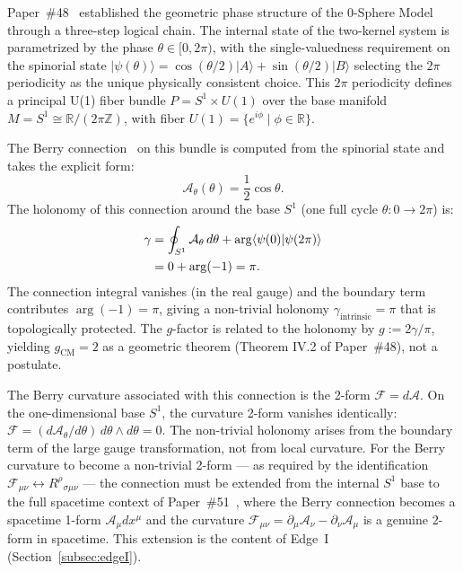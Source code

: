 \documentclass[%
 reprint, amsmath,amssymb, aps, prd, ]{revtex4-2}
\numberwithin{equation}{section}
\newcommand{\iphase}{\theta}
\newcommand{\BerryA}{\mathcal{A}}
\newcommand{\BerryF}{\mathcal{F}}
\begin{document}
Paper~\#48~\cite{hanamura48} established the geometric phase structure of the 0-Sphere Model through a three-step logical chain.
The internal state of the two-kernel system is parametrized by the phase $\iphase \in [0, 2\pi)$, with the single-valuedness requirement on the spinorial state $|\psi(\iphase)\rangle = \cos(\iphase/2)|A\rangle + \sin(\iphase/2)|B\rangle$ selecting the $2\pi$ periodicity as the unique physically consistent choice.
This $2\pi$ periodicity defines a principal U(1) fiber bundle $P = S^1 \times U(1)$ over the base manifold $M = S^1 \cong \mathbb{R}/(2\pi\mathbb{Z})$, with fiber $U(1) = \{e^{i\phi} \mid \phi \in \mathbb{R}\}$.

The Berry connection~\cite{Berry1984} on this bundle is computed from the spinorial state and takes the explicit form:
\begin{equation}
\BerryA_\theta(\theta) = \frac{1}{2}\cos\theta.
\label{eq:berry_connection}
\end{equation}
The holonomy of this connection around the base $S^1$ (one full cycle $\iphase: 0 \to 2\pi$) is:
\begin{align}
\gamma
&= \oint_{S^1} \BerryA_\theta \, d\theta + \arg\langle\psi(0)|\psi(2\pi)\rangle
\notag\\
&= 0 + \arg(-1) = \pi.
\label{eq:holonomy}
\end{align}
The connection integral vanishes (in the real gauge) and the boundary term contributes $\arg(-1) = \pi$, giving a non-trivial holonomy $\gamma_\mathrm{intrinsic} = \pi$ that is topologically protected.
The $g$-factor is related to the holonomy by $g := 2\gamma/\pi$, yielding $g_\mathrm{CM} = 2$ as a geometric theorem (Theorem IV.2 of Paper~\#48), not a postulate.

The Berry curvature associated with this connection is the 2-form $\BerryF = d\BerryA$.
On the one-dimensional base $S^1$, the curvature 2-form vanishes identically: $\BerryF = (d\BerryA_\theta/d\theta)\, d\theta \wedge d\theta = 0$.
The non-trivial holonomy arises from the boundary term of the large gauge transformation, not from local curvature.
For the Berry curvature to become a non-trivial 2-form --- as required by the identification $\BerryF_{\mu\nu} \leftrightarrow R^\rho{}_{\sigma\mu\nu}$ --- the connection must be extended from the internal $S^1$ base to the full spacetime context of Paper~\#51~\cite{hanamura51}, where the Berry connection becomes a spacetime 1-form $\BerryA_\mu dx^\mu$ and the curvature $\BerryF_{\mu\nu} = \partial_\mu \BerryA_\nu - \partial_\nu \BerryA_\mu$ is a genuine 2-form in spacetime.
This extension is the content of Edge~I (Section~\ref{subsec:edgeI}).
\end{document}

